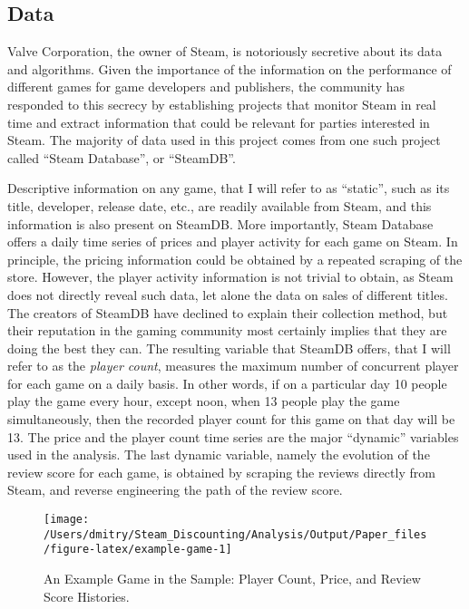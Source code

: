 \documentclass[
  12pt,
  pagebackref]{article}
\begin{document}
\hypertarget{data}{%
\subsection{Data}\label{data}}

Valve Corporation, the owner of Steam, is notoriously secretive about
its data and algorithms. Given the importance of the information on the
performance of different games for game developers and publishers, the
community has responded to this secrecy by establishing projects that
monitor Steam in real time and extract information that could be
relevant for parties interested in Steam. The majority of data used in
this project comes from one such project called ``Steam Database'', or
``SteamDB''.

Descriptive information on any game, that I will refer to as ``static'',
such as its title, developer, release date, etc., are readily available
from Steam, and this information is also present on SteamDB. More
importantly, Steam Database offers a daily time series of prices and
player activity for each game on Steam. In principle, the pricing
information could be obtained by a repeated scraping of the store.
However, the player activity information is not trivial to obtain, as
Steam does not directly reveal such data, let alone the data on sales of
different titles. The creators of SteamDB have declined to explain their
collection method, but their reputation in the gaming community most
certainly implies that they are doing the best they can. The resulting
variable that SteamDB offers, that I will refer to as the \emph{player
count}, measures the maximum number of concurrent player for each game
on a daily basis. In other words, if on a particular day 10 people play
the game every hour, except noon, when 13 people play the game
simultaneously, then the recorded player count for this game on that day
will be 13. The price and the player count time series are the major
``dynamic'' variables used in the analysis. The last dynamic variable,
namely the evolution of the review score for each game, is obtained by
scraping the reviews directly from Steam, and reverse engineering the
path of the review score.

\begin{figure}[h]

{\centering \texttt{[image: /Users/dmitry/Steam\_Discounting/Analysis/Output/Paper\_files/figure-latex/example-game-1]} 

}

\caption{\label{exampleGame} An Example Game in the Sample: Player Count, Price, and Review Score Histories.}\label{fig:example-game}
\end{figure}
\end{document}
